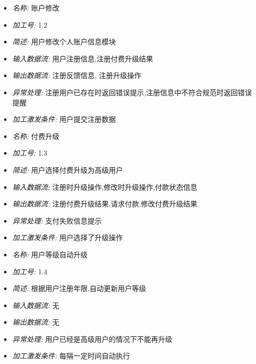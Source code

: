 \documentclass{article}
\begin{document}
\begin{CJK*}{UTF8}{gbsn}
\begin{itemize}
\end{itemize}


\vspace{-1mm}


\begin{itemize}
\item \textit{名称: } 账户修改
\item \textit{加工号: } 1.2
\item \textit{简述: } 用户修改个人账户信息模块
\item \textit{输入数据流: } 用户注册信息,注册付费升级结果
\item \textit{输出数据流: } 注册反馈信息, 注册升级操作
\item \textit{异常处理: } 注册用户已存在时返回错误提示,注册信息中不符合规范时返回错误提醒 
\item \textit{加工激发条件: } 用户提交注册数据

\end{itemize}


\vspace{-1mm}


\begin{itemize}
\item \textit{名称: } 付费升级
\item \textit{加工号: } 1.3
\item \textit{简述: } 用户选择付费升级为高级用户
\item \textit{输入数据流: } 注册时升级操作,修改时升级操作,付款状态信息 
\item \textit{输出数据流: } 注册付费升级结果,请求付款,修改付费升级结果 
\item \textit{异常处理: } 支付失败信息提示
\item \textit{加工激发条件: } 用户选择了升级操作

\end{itemize}


\vspace{-1mm}


\begin{itemize}
\item \textit{名称: } 用户等级自动升级
\item \textit{加工号: } 1.4
\item \textit{简述: } 根据用户注册年限,自动更新用户等级 
\item \textit{输入数据流: } 无
\item \textit{输出数据流: } 无
\item \textit{异常处理: } 用户已经是高级用户的情况下不能再升级 
\item \textit{加工激发条件: } 每隔一定时间自动执行


\end{itemize}
\end{CJK*}
\end{document}
